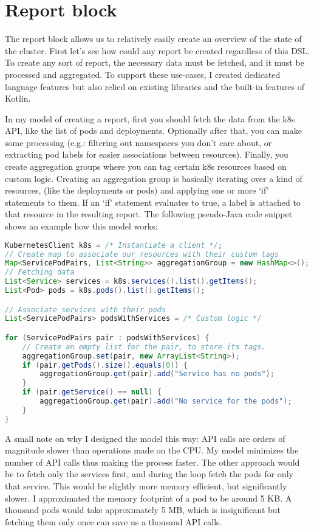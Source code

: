 \section{Report block}

The report block allows us to relatively easily create an overview of the state of the cluster. First let's see how could any report be created regardless of this DSL. To create any sort of report, the necessary data must be fetched, and it must be processed and aggregated. To support these use-cases, I created dedicated language features but also relied on existing libraries and the built-in features of Kotlin.

In my model of creating a report, first you should fetch the data from the k8s API, like the list of pods and deployments. Optionally after that, you can make some processing (e.g.: filtering out namespaces you don't care about, or extracting pod labels for easier associations between resources). Finally, you create aggregation groups where you can tag certain k8s resources based on custom logic. Creating an aggregation group is basically iterating over a kind of resources, (like the deployments or pods) and applying one or more `if' statements to them. If an `if' statement evaluates to true, a label is attached to that resource in the resulting report. The following pseudo-Java code snippet shows an example how this model works:

\begin{lstlisting}[caption={Example report in pseudo-Java},language=Java,label=code:pseudo_report]
KubernetesClient k8s = /* Instantiate a client */;
// Create map to associate our resources with their custom tags
Map<ServicePodPairs, List<String>> aggregationGroup = new HashMap<>();
// Fetching data
List<Service> services = k8s.services().list().getItems();
List<Pod> pods = k8s.pods().list().getItems();

// Associate services with their pods
List<ServicePodPairs> podsWithServices = /* Custom logic */

for (ServicePodPairs pair : podsWithServices) {
    // Create an empty list for the pair, to store its tags.
    aggregationGroup.set(pair, new ArrayList<String>);
    if (pair.getPods().size().equals(0)) {
        aggregationGroup.get(pair).add("Service has no pods");
    }
    if (pair.getService() == null) {
        aggregationGroup.get(pair).add("No service for the pods");
    }
}
\end{lstlisting}

A small note on why I designed the model this way: API calls are orders of magnitude slower than operations made on the CPU. My model minimizes the number of API calls thus making the process faster. The other approach would be to fetch only the services first, and during the loop fetch the pods for only that service. This would be slightly more memory efficient, but significantly slower. I approximated the memory footprint of a pod to be around 5 KB. A thousand pods would take approximately 5 MB, which is insignificant but fetching them only once can save us a thousand API calls.

